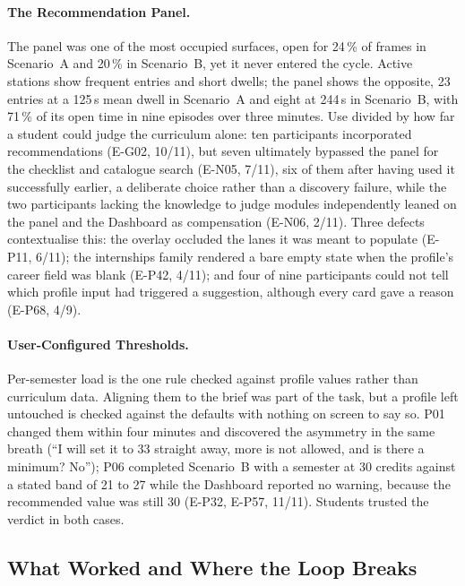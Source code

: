 \documentclass[a4paper,twoside]{article}
\begin{document}
\paragraph{The Recommendation Panel.}
The panel was one of the most occupied surfaces, open for 24\,\% of frames in Scenario~A and 20\,\% in Scenario~B, yet it never entered the cycle. Active stations show frequent entries and short dwells; the panel shows the opposite, 23 entries at a 125\,s mean dwell in Scenario~A and eight at 244\,s in Scenario~B, with 71\,\% of its open time in nine episodes over three minutes. Use divided by how far a student could judge the curriculum alone: ten participants incorporated recommendations (E-G02, 10/11), but seven ultimately bypassed the panel for the checklist and catalogue search (E-N05, 7/11), six of them after having used it successfully earlier, a deliberate choice rather than a discovery failure, while the two participants lacking the knowledge to judge modules independently leaned on the panel and the Dashboard as compensation (E-N06, 2/11). Three defects contextualise this: the overlay occluded the lanes it was meant to populate (E-P11, 6/11); the internships family rendered a bare empty state when the profile's career field was blank (E-P42, 4/11); and four of nine participants could not tell which profile input had triggered a suggestion, although every card gave a reason (E-P68, 4/9).

\paragraph{User-Configured Thresholds.}
Per-semester load is the one rule checked against profile values rather than curriculum data. Aligning them to the brief was part of the task, but a profile left untouched is checked against the defaults with nothing on screen to say so. P01 changed them within four minutes and discovered the asymmetry in the same breath (``I will set it to 33 straight away, more is not allowed, and is there a minimum? No''); P06 completed Scenario~B with a semester at 30 credits against a stated band of 21 to 27 while the Dashboard reported no warning, because the recommended value was still 30 (E-P32, E-P57, 11/11). Students trusted the verdict in both cases.

\subsection{What Worked and Where the Loop Breaks}
\end{document}
